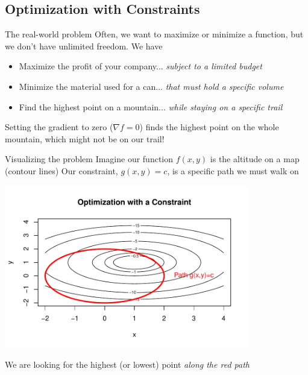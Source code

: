 \documentclass[aspectratio=169]{beamer}\usepackage[]{graphicx}\usepackage[]{xcolor}
\newenvironment{knitrout}{}{} %
\begin{document}
\subsection{Optimization with Constraints}

\begin{frame}{The real-world problem}
  Often, we want to maximize or minimize a function, but we don't have unlimited freedom. We have 
  \vfill
  \begin{itemize}
    \item Maximize the profit of your company... \textit{subject to a limited budget}
    \vfill
    \item Minimize the material used for a can... \textit{that must hold a specific volume}
    \vfill
    \item Find the highest point on a mountain... \textit{while staying on a specific trail}
  \end{itemize}
  \vfill
  Setting the gradient to zero ($\nabla f = 0$) finds the highest point on the whole mountain, which might not be on our trail!
\end{frame}

\begin{frame}{Visualizing the problem}
  Imagine our function $f(x,y)$ is the altitude on a map (contour lines)
  \vfill
  Our constraint, $g(x,y) = c$, is a specific path we must walk on
\end{frame}

\begin{frame}[fragile]
  \begin{center}
\begin{knitrout}
\color{fgcolor}
\includegraphics[width=0.8\textwidth]{FIGS/L04-fig_constraint-1} 
\end{knitrout}
\end{center}
We are looking for the highest (or lowest) point \textit{along the red path}
\end{frame}
\end{document}
